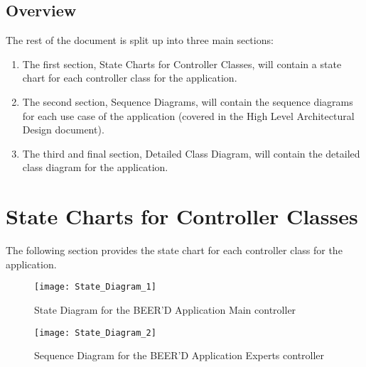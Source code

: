 \documentclass[]{article}
\begin{document}
\subsection{Overview}
\label{sub:overview}
The rest of the document is split up into three main sections:
\begin{enumerate}[-]
	\item The first section, State Charts for Controller Classes, will contain a state chart for each controller class for the application.
	\item The second section, Sequence Diagrams, will contain the sequence diagrams for each use case of the application (covered in the High Level Architectural Design document).
	\item The third and final section, Detailed Class Diagram, will contain the detailed class diagram for the application.
\end{enumerate}




\newpage
\section{State Charts for Controller Classes}
\label{sec:state_charts_for_controller_classes}
The following section provides the state chart for each controller class for the application.
\begin{figure}[!htbp]
\texttt{[image: State\_Diagram\_1]}
\caption{State Diagram for the BEER'D Application Main controller}
\end{figure}
\begin{figure}[!htbp]
\texttt{[image: State\_Diagram\_2]}
\caption{Sequence Diagram for the BEER'D Application Experts controller}
\end{figure}









\newpage
\end{document}
